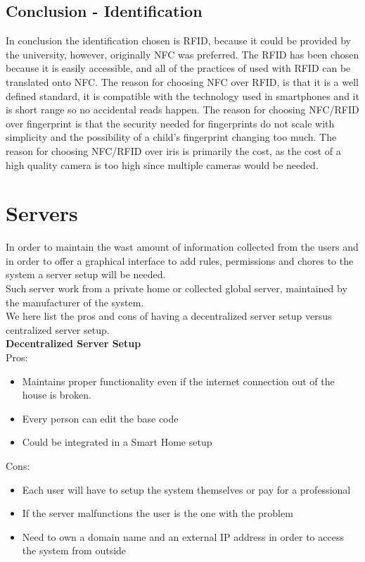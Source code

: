 \subsection{Conclusion - Identification}
In conclusion the identification chosen is RFID, because it could be provided by the university, however, originally NFC was preferred. 
The RFID has been chosen because it is easily accessible, and all of the practices of used with RFID can be translated onto NFC. The reason for choosing NFC over RFID, is that it is a well defined standard, it is compatible with the technology used in smartphones and it is short range so no accidental reads happen. The reason for choosing NFC/RFID over fingerprint is that the security needed for fingerprints do not scale with simplicity and the possibility of a child's fingerprint changing too much. The reason for choosing NFC/RFID over iris is primarily the cost, as the cost of a high quality camera is too high since multiple cameras would be needed.

\section{Servers}
In order to maintain the wast amount of information collected from the users and in order to offer a graphical interface to add rules, permissions and chores to the system a server setup will be needed.\\
Such server work from a private home or collected global server, maintained by the manufacturer of the system.\\

We here list the pros and cons of having a decentralized server setup versus centralized server setup.\\

\textbf{Decentralized Server Setup}\\
Pros:
\begin{itemize}
	\item Maintains proper functionality even if the internet connection out of the house is broken.
  \item Every person can edit the base code
  \item Could be integrated in a Smart Home setup
\end{itemize}

Cons:
\begin{itemize}
	\item Each user will have to setup the system themselves or pay for a professional
  \item If the server malfunctions the user is the one with the problem
  \item Need to own a domain name and an external IP address in order to access the system from outside
\end{itemize}

